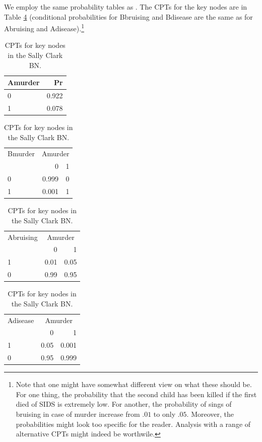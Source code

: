 \documentclass[10pt,]{scrartcl}
\begin{document}
We employ the same probability tables as \citet{Fenton2018Risk}. The CPTs for the key nodes are in Table \ref{tab:scCPT} (conditional probabilities for \textsf{Bbruising} and \textsf{Bdisease} are the same as for \textsf{Abruising} and \textsf{Adisease}).\footnote{Note that one might have somewhat different view on what these should be. For one thing, the probability that the second child has been killed if the first died of SIDS is extremely low. For another, the probability of  sings of bruising in case of murder increase from $.01$ to only $.05$. Moreover, the probabilities might look too specific for the reader.  Analysis with a range of alternative CPTs might indeed be worthwile.}
\begin{table}[H]
\hspace{20mm}\begin{minipage}{.4\textwidth}
\begin{tabular}{lr}
\toprule
Amurder & Pr\\
\midrule
0 & 0.922\\
1 & 0.078\\
\bottomrule
\end{tabular}
\end{minipage}
\begin{minipage}{.4\textwidth}
\begin{tabular}{lrr}
\toprule
\multicolumn{1}{c}{Bmurder} & \multicolumn{2}{c}{Amurder} \\
  & 0 & 1\\
\midrule
0 & 0.999 & 0\\
1 & 0.001 & 1\\
\bottomrule
\end{tabular}
\end{minipage}

\vspace{5mm}


\hspace{20mm} \begin{minipage}{.4\textwidth}
\begin{tabular}{lrr}
\toprule
\multicolumn{1}{c}{Abruising} & \multicolumn{2}{c}{Amurder} \\
  & 0 & 1\\
\midrule
1 & 0.01 & 0.05\\
0 & 0.99 & 0.95\\
\bottomrule
\end{tabular}
\end{minipage}
\begin{minipage}{.5\textwidth}
\begin{tabular}{lrr}
\toprule
\multicolumn{1}{c}{Adisease} & \multicolumn{2}{c}{Amurder} \\
  & 0 & 1\\
\midrule
1 & 0.05 & 0.001\\
0 & 0.95 & 0.999\\
\bottomrule
\end{tabular}
\end{minipage}
\caption{CPTs for key nodes in the Sally Clark BN.}
\label{tab:scCPT}
\end{table}
\end{document}
